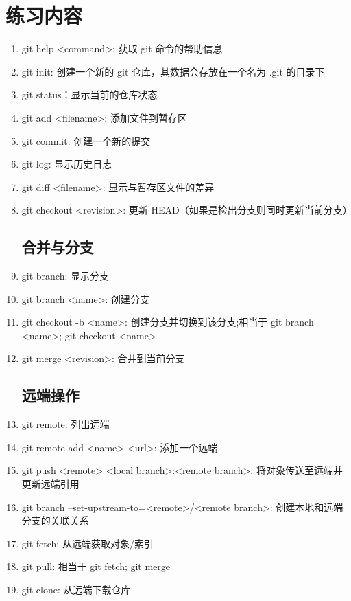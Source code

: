 \documentclass[UTF8]{ctexart}
\begin{document}


\newpage
\tableofcontents %
\newpage

\section{练习内容}
\begin{enumerate}
		\subsection{基础}
		\item git help <command>: 获取 git 命令的帮助信息
        \item git init: 创建一个新的 git 仓库，其数据会存放在一个名为 .git 的目录下
        \item git status：显示当前的仓库状态
        \item git add <filename>: 添加文件到暂存区
        \item git commit: 创建一个新的提交
        \item git log: 显示历史日志
        \item git diff <filename>: 显示与暂存区文件的差异
        \item git checkout <revision>: 更新 HEAD（如果是检出分支则同时更新当前分支）
    
    \subsection{合并与分支}
        \item git branch: 显示分支
        \item git branch <name>: 创建分支
        \item git checkout -b <name>: 创建分支并切换到该分支;相当于 git branch <name>; git checkout <name>
        \item git merge <revision>: 合并到当前分支

    \subsection{远端操作}
        \item git remote: 列出远端
        \item git remote add <name> <url>: 添加一个远端
        \item git push <remote> <local branch>:<remote branch>: 将对象传送至远端并更新远端引用
        \item git branch --set-upstream-to=<remote>/<remote branch>: 创建本地和远端分支的关联关系
        \item git fetch: 从远端获取对象/索引
        \item git pull: 相当于 git fetch; git merge
        \item git clone: 从远端下载仓库
    

\end{enumerate}
\end{document}

